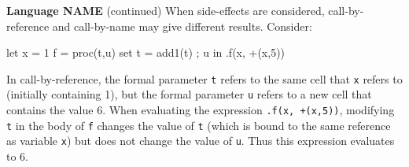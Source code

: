 \begin{minipage}[t]{\sw}
\slidenumber
\LARGE
{\bf Language NAME} (continued)\exx
When side-effects are considered,
call-by-reference and call-by-name
may give different results.
Consider:
\begin{qv}
let
  x = 1
  f = proc(t,u)
        {
          set t = add1(t) ;
          u
        }
in
  .f(x, +(x,5))
\end{qv}
In call-by-reference, the formal parameter \verb't' refers
to the same cell that \verb'x' refers to (initially containing 1),
but the formal parameter \verb'u' refers to a new cell
that contains the value 6.
When evaluating the expression \verb'.f(x, +(x,5))',
modifying \verb't' in the body of \verb'f' changes the value
of \verb't' (which is bound to the same reference as variable \verb'x')
but does not change the value of \verb'u'.
Thus this expression evaluates to 6.
\end{minipage}

